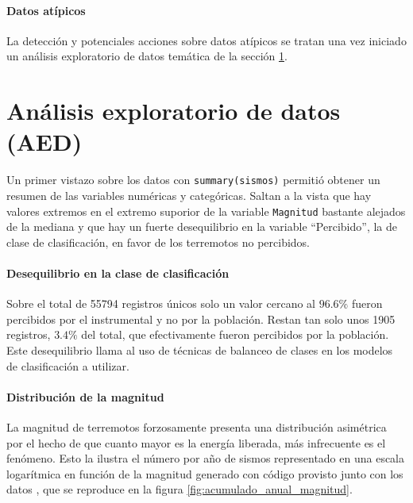 \documentclass[a4paper]{report}
\begin{document}
\paragraph{Datos atípicos}
La detección y potenciales acciones sobre datos atípicos se tratan una vez iniciado un análisis exploratorio de datos temática de la sección \ref{sec:AED}.


\section{Análisis exploratorio de datos (AED)}\label{sec:AED}

Un primer vistazo sobre los datos con \verb'summary(sismos)' permitió obtener un resumen de las variables numéricas y categóricas.
Saltan a la vista que hay valores extremos en el extremo suporior de la variable \verb'Magnitud' bastante alejados de la mediana y que hay un fuerte desequilibrio en la variable ``Percibido'', la de clase de clasificación, en favor de los terremotos no percibidos.


\paragraph{Desequilibrio en la clase de clasificación}
Sobre el total de 55794 registros únicos solo un valor cercano al \(96.6\%\) fueron percibidos por el instrumental y no por la población.
Restan tan solo unos 1905 registros, \(3.4\%\) del total, que efectivamente fueron percibidos por la población.
Este desequilibrio llama al uso de técnicas de balanceo de clases en los modelos de clasificación a utilizar.


\paragraph{Distribución de la magnitud}
La magnitud de terremotos forzosamente presenta una distribución asimétrica por el hecho de que cuanto mayor es la energía liberada, más infrecuente es el fenómeno.
Esto la ilustra el número por año de sismos representado en una escala logarítmica en función de la magnitud generado con código provisto junto con los datos \cite[sección 4.2.1]{daniela_parada_ic-datasets-docencia_nodate}, que se reproduce en la figura \ref{fig:acumulado_anual_magnitud}.

\end{document}
